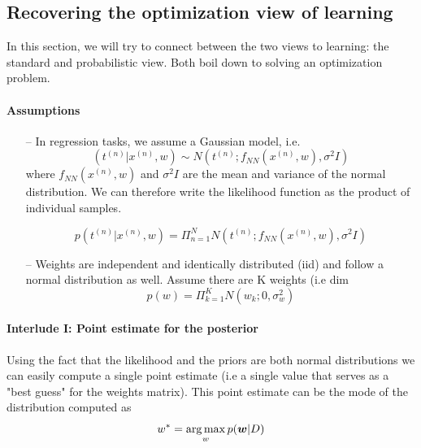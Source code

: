 \documentclass[main]{subfiles}
\begin{document}
\subsection{Recovering the optimization view of learning}
In this section, we will try to connect between the two views to learning: the standard and probabilistic view. Both boil down to solving an optimization problem.

\paragraph{Assumptions}
\begin{itemize}
    \item[--] In regression tasks, we assume a Gaussian model, i.e.
    \begin{equation}
        (t^{(n)}| x^{(n)},w) \sim N(t^{(n)}; f_{NN}(x^{(n)},w), \sigma^2 I)
    \end{equation}
    where $f_{NN}(x^{(n)},w)$ and $\sigma^2 I$ are the mean and variance of the normal distribution. We can therefore write the likelihood function as the product of individual samples.
    
    \begin{equation}
        p(t^{(n)}| x^{(n)},w) = \Pi_{n=1}^{N} N(t^{(n)}; f_{NN}(x^{(n)},w), \sigma^2 I)
    \end{equation}
    \item[--] Weights are independent and identically distributed (iid) and follow a normal distribution as well. Assume there are K weights (i.e dim
    \begin{equation}
        p(w) = \Pi_{k=1}^{K} N(w_k; 0, \sigma^2_w)
    \end{equation}
\end{itemize}

\paragraph{Interlude I: Point estimate for the posterior}
Using the fact that the likelihood and the priors are both normal distributions we can easily compute a single point estimate (i.e a single value that serves as a "best guess" for the weights matrix). This point estimate can be the mode of the distribution computed as
\begin{equation}
    w^* = \operatorname*{arg\,max}_w p(\bm{w}|D)
\end{equation}
\end{document}

